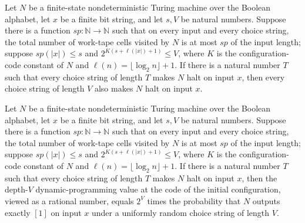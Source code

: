 \begin{theorem}
\label{Randomized.BPLInP.haltsWithin_of_codes}
\leanok
{}
Let $N$ be a finite-state nondeterministic Turing machine over the Boolean alphabet, let
$x$ be a finite bit string, and let $s,V$ be natural numbers. Suppose there is a
function $sp:\mathbb{N}\to\mathbb{N}$ such that on every input and every choice string,
the total number of work-tape cells visited by $N$ is at most $sp$ of the input length;
suppose $sp(|x|)\le s$ and $2^{K(s+\ell(|x|)+1)}\le V$, where $K$ is the
configuration-code constant of $N$ and $\ell(n)=\lfloor\log_2 n\rfloor+1$. If there is a
natural number $T$ such that every choice string of length $T$ makes $N$ halt on input
$x$, then every choice string of length $V$ also makes $N$ halt on input $x$.
\end{theorem}

\begin{theorem}
\label{Randomized.BPLInP.dpVal_init}
\leanok
{}
Let $N$ be a finite-state nondeterministic Turing machine over the Boolean alphabet, let
$x$ be a finite bit string, and let $s,V$ be natural numbers. Suppose there is a
function $sp:\mathbb{N}\to\mathbb{N}$ such that on every input and every choice string,
the total number of work-tape cells visited by $N$ is at most $sp$ of the input length;
suppose $sp(|x|)\le s$ and $2^{K(s+\ell(|x|)+1)}\le V$, where $K$ is the
configuration-code constant of $N$ and $\ell(n)=\lfloor\log_2 n\rfloor+1$. If there is a
natural number $T$ such that every choice string of length $T$ makes $N$ halt on input
$x$, then the depth-$V$ dynamic-programming value at the code of the initial
configuration, viewed as a rational number, equals $2^V$ times the probability that $N$
outputs exactly $[1]$ on input $x$ under a uniformly random choice string of length $V$.
\end{theorem}
